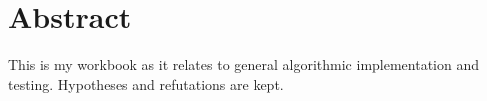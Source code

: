 \chapter*{Abstract}

This is my workbook as it relates to general algorithmic implementation and testing. Hypotheses and
refutations are kept.

\cleardoublepage
